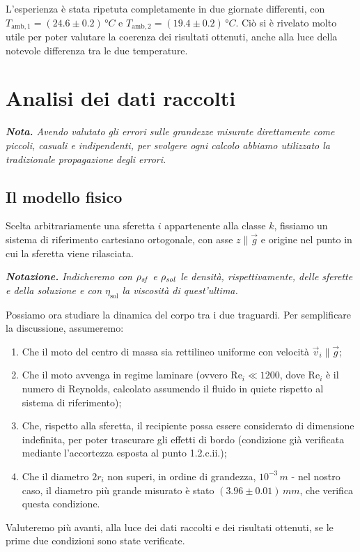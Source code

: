 \documentclass{article}
\begin{document}
L'esperienza è stata ripetuta completamente in due giornate differenti,
con $T_{\text{amb},1} = (24.6\pm0.2)\,\unit{\degree C}$
e $T_{\text{amb},2} = (19.4\pm0.2)\,\unit{\degree C}$.
Ciò si è rivelato molto utile per poter valutare la
coerenza dei risultati ottenuti, anche alla luce della
notevole differenza tra le due temperature.


\section{Analisi dei dati raccolti}
\emph{\textbf{Nota.}
Avendo valutato gli errori sulle grandezze misurate direttamente
come piccoli, casuali e indipendenti, per svolgere ogni calcolo
abbiamo utilizzato la tradizionale propagazione degli errori.
}

\subsection{Il modello fisico}

Scelta arbitrariamente una sferetta $i$ appartenente alla classe $k$,
fissiamo un sistema di riferimento cartesiano ortogonale, con asse
$z\parallel\vec{g}$ e origine nel punto in cui la sferetta viene rilasciata.

\vspace{2mm}
\emph{
  \textbf{Notazione.} Indicheremo con $\rho_\text{\emph{sf}}$ e
  $\rho_\text{\emph{sol}}$ le densità, rispettivamente, delle sferette
  e della soluzione e con $\eta_\text{sol}$ la viscosità di quest'ultima.
}
\vspace{2mm}

Possiamo ora studiare la dinamica del corpo tra i due traguardi.
Per semplificare la discussione, assumeremo:
\begin{enumerate}
  \item Che il moto del centro di massa sia rettilineo uniforme con velocità
    $\vec{v}_i\parallel\vec{g}$;
  \item Che il moto avvenga in regime laminare
    (ovvero $\text{Re}_i \ll 1200$, dove $\text{Re}_i$ è il numero di
    Reynolds, calcolato assumendo il fluido in quiete rispetto al
    sistema di riferimento);
  \item Che, rispetto alla sferetta, il recipiente possa essere
    considerato di dimensione indefinita, per poter trascurare gli effetti
    di bordo (condizione già verificata mediante l'accortezza esposta
    al punto 1.2.c.ii.);
  \item Che il diametro $2r_i$ non superi, in ordine di grandezza,
    $10^{-3}\,\unit{m}$ - nel nostro caso, il diametro più grande misurato
    è stato $(3.96\pm0.01)\,\unit{mm}$, che verifica questa condizione.
\end{enumerate}
Valuteremo più avanti, alla luce dei dati raccolti e dei risultati ottenuti,
se le prime due condizioni sono state verificate.
\end{document}
